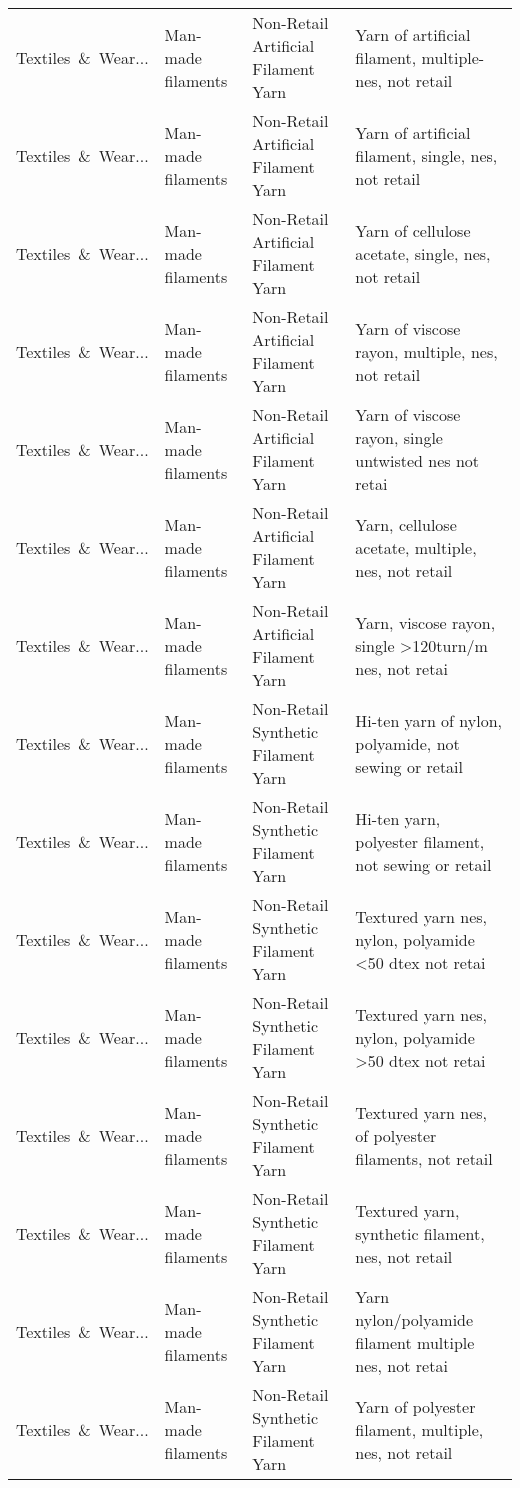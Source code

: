 \begin{appendices}
\begin{xltabular}{\textwidth}{|p{0.10\textwidth}|p{0.25\textwidth}|p{0.24\textwidth}|p{0.31\textwidth}|}
Textiles\ \&\ Wear... & Man-made filaments & Non-Retail Artificial Filament Yarn & Yarn of artificial filament, multiple-nes, not retail \\
Textiles\ \&\ Wear... & Man-made filaments & Non-Retail Artificial Filament Yarn & Yarn of artificial filament, single, nes, not retail \\
Textiles\ \&\ Wear... & Man-made filaments & Non-Retail Artificial Filament Yarn & Yarn of cellulose acetate, single, nes, not retail \\
Textiles\ \&\ Wear... & Man-made filaments & Non-Retail Artificial Filament Yarn & Yarn of viscose rayon, multiple, nes, not retail \\
Textiles\ \&\ Wear... & Man-made filaments & Non-Retail Artificial Filament Yarn & Yarn of viscose rayon, single untwisted nes not retai \\
Textiles\ \&\ Wear... & Man-made filaments & Non-Retail Artificial Filament Yarn & Yarn, cellulose acetate, multiple, nes, not retail \\
Textiles\ \&\ Wear... & Man-made filaments & Non-Retail Artificial Filament Yarn & Yarn, viscose rayon, single >120turn/m nes, not retai \\
Textiles\ \&\ Wear... & Man-made filaments & Non-Retail Synthetic Filament Yarn & Hi-ten yarn of nylon, polyamide, not sewing or retail \\
Textiles\ \&\ Wear... & Man-made filaments & Non-Retail Synthetic Filament Yarn & Hi-ten yarn, polyester filament, not sewing or retail \\
Textiles\ \&\ Wear... & Man-made filaments & Non-Retail Synthetic Filament Yarn & Textured yarn nes, nylon, polyamide <50 dtex not retai \\
Textiles\ \&\ Wear... & Man-made filaments & Non-Retail Synthetic Filament Yarn & Textured yarn nes, nylon, polyamide >50 dtex not retai \\
Textiles\ \&\ Wear... & Man-made filaments & Non-Retail Synthetic Filament Yarn & Textured yarn nes, of polyester filaments, not retail \\
Textiles\ \&\ Wear... & Man-made filaments & Non-Retail Synthetic Filament Yarn & Textured yarn, synthetic filament, nes, not retail \\
Textiles\ \&\ Wear... & Man-made filaments & Non-Retail Synthetic Filament Yarn & Yarn nylon/polyamide filament multiple nes, not retai \\
Textiles\ \&\ Wear... & Man-made filaments & Non-Retail Synthetic Filament Yarn & Yarn of polyester filament, multiple, nes, not retail \\

\end{xltabular}
\end{appendices}
